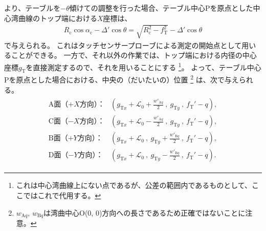 \clearpage
より、テーブルを$-\theta$傾けて\AlocationLength の調整を行った場合、テーブル中心Pを原点とした中心湾曲線のトップ端における$X$座標は、
\begin{align*}
  R_\mathrm c\cos\alpha_\mathrm c-\Delta'\cos\theta = \sqrt{R_\mathrm c^2-f_\mathrm T^2}-\Delta'\cos\theta
\end{align*}
で与えられる。
これはタッチセンサープローブによる測定の開始点として用いることができる。
一方で、それ以外の作業では、トップ端における内径の中心座標$g_\mathrm T$を直接測定するので、それを用いることにする
\footnote{これは中心湾曲線上にない点であるが、公差の範囲内であるものとして、ここではこれで代用する。}。
よって、テーブル中心Pを原点とした場合における、\DimpleFirstRow 中央の（だいたいの）位置
\footnote{$w_{\mathrm Aq}$, $w_{\mathrm Bq}$は湾曲中心O(0, 0)方向への長さであるため正確ではないことに注意。}\relax
は、次で与えられる。
\begin{align*}
\begin{array}{rl}
  \text{A面（$+X$方向）：}
  & \displaystyle
    \left(
      g_{\mathrm Tx}+\mathcal L_0+\frac{w'_{\mathrm Aq}}2~,~
      g_{\mathrm Ty}~,~
      f_\mathrm T'-q
    \right),\\[12pt]
  \text{C面（$-X$方向）：}
  & \displaystyle
    \left(
      g_{\mathrm Tx}+\mathcal L_0-\frac{w'_{\mathrm Aq}}2~,~
      g_{\mathrm Ty}~,~
      f_\mathrm T'-q
    \right),\\[12pt]
  \text{B面（$+Y$方向）：}
  & \displaystyle
    \left(
      g_{\mathrm Tx}+\mathcal L_0~,~
      g_{\mathrm Ty}+\frac{w'_{\mathrm Bq}}2~,~
      f_\mathrm T'-q
    \right),\\[12pt]
  \text{D面（$-Y$方向）：}
  & \displaystyle
    \left(
      g_{\mathrm Tx}+\mathcal L_0~,~
      g_{\mathrm Ty}-\frac{w'_{\mathrm Bq}}2~,~
      f_\mathrm T'-q
    \right).
\end{array}
\end{align*}
